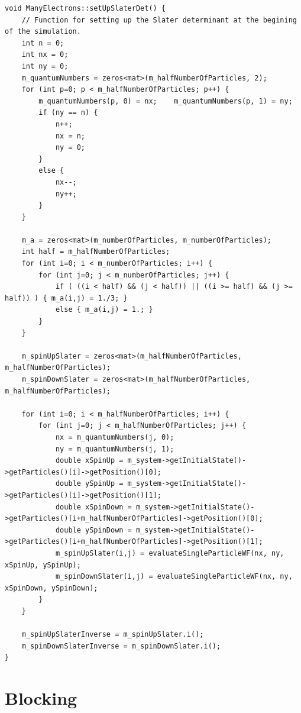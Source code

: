 \documentclass[../main.tex]{subfiles}
\begin{document}
\begin{lstlisting}[title={Setting up the (Split) Slater Determinant in C++}]
void ManyElectrons::setUpSlaterDet() {
    // Function for setting up the Slater determinant at the begining of the simulation.
    int n = 0;
    int nx = 0;
    int ny = 0;
    m_quantumNumbers = zeros<mat>(m_halfNumberOfParticles, 2);
    for (int p=0; p < m_halfNumberOfParticles; p++) {
        m_quantumNumbers(p, 0) = nx;    m_quantumNumbers(p, 1) = ny;
        if (ny == n) {
            n++;
            nx = n;
            ny = 0;
        }
        else {
            nx--;
            ny++;
        }
    }

    m_a = zeros<mat>(m_numberOfParticles, m_numberOfParticles);
    int half = m_halfNumberOfParticles;
    for (int i=0; i < m_numberOfParticles; i++) {
        for (int j=0; j < m_numberOfParticles; j++) {
            if ( ((i < half) && (j < half)) || ((i >= half) && (j >= half)) ) { m_a(i,j) = 1./3; }
            else { m_a(i,j) = 1.; }
        }
    }

    m_spinUpSlater = zeros<mat>(m_halfNumberOfParticles, m_halfNumberOfParticles);
    m_spinDownSlater = zeros<mat>(m_halfNumberOfParticles, m_halfNumberOfParticles);

    for (int i=0; i < m_halfNumberOfParticles; i++) {
        for (int j=0; j < m_halfNumberOfParticles; j++) {
            nx = m_quantumNumbers(j, 0);
            ny = m_quantumNumbers(j, 1);
            double xSpinUp = m_system->getInitialState()->getParticles()[i]->getPosition()[0];
            double ySpinUp = m_system->getInitialState()->getParticles()[i]->getPosition()[1];
            double xSpinDown = m_system->getInitialState()->getParticles()[i+m_halfNumberOfParticles]->getPosition()[0];
            double ySpinDown = m_system->getInitialState()->getParticles()[i+m_halfNumberOfParticles]->getPosition()[1];
            m_spinUpSlater(i,j) = evaluateSingleParticleWF(nx, ny, xSpinUp, ySpinUp);
            m_spinDownSlater(i,j) = evaluateSingleParticleWF(nx, ny, xSpinDown, ySpinDown);
        }
    }

    m_spinUpSlaterInverse = m_spinUpSlater.i();
    m_spinDownSlaterInverse = m_spinDownSlater.i();
}
\end{lstlisting}

\section{Blocking}
\end{document}
